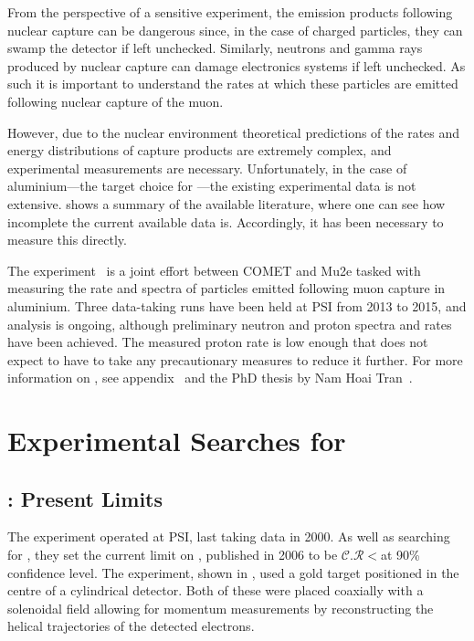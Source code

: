 From the perspective of a sensitive \mueconv experiment, the emission products following nuclear capture can be dangerous since, in the case of charged particles, they can swamp the detector if left unchecked.
Similarly, neutrons and gamma rays produced by nuclear capture can damage electronics systems if left unchecked.
As such it is important to understand the rates at which these particles are emitted following nuclear capture of the muon.

However, due to the nuclear environment theoretical predictions of the rates and energy distributions of capture products are extremely complex, and experimental measurements are necessary.
Unfortunately, in the case of aluminium---the target choice for \COMET---the existing experimental data is not extensive.
 shows a summary of the available literature, where one can see how incomplete the current available data is.
Accordingly, it has been necessary to measure this directly.

The \alcap experiment~\cite{AlcapProposal2012} is a joint effort between COMET and Mu2e tasked with measuring the rate and spectra of particles emitted following muon capture in aluminium.
Three data-taking runs have been held at \ac{PSI} from 2013 to 2015, and analysis is ongoing, although preliminary neutron and proton spectra and rates have been achieved.
The measured proton rate is low enough that \COMET does not expect to have to take any precautionary measures to reduce it further.
For more information on \alcap, see appendix~ and the PhD thesis by Nam Hoai Tran~\cite{NamThesis}.

\section{Experimental Searches for \mueconv }
\subsection{\sindrumII: Present Limits}
\FigMuecSindrumII
The \sindrumII experiment operated at \ac{PSI}, last taking data in 2000.
As well as searching for \muThreeE, they set the 
current limit on \mueconv, published in 2006 to be $\mathcal{C.R}<$\senseSindrum at 90\% confidence level.
The experiment, shown in , used a gold target positioned in the centre of a cylindrical detector.
Both of these were placed coaxially with a solenoidal field allowing for momentum measurements by reconstructing the helical trajectories of the detected electrons.

